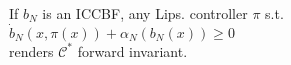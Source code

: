 \documentclass[preview]{standalone}
\begin{document}
\begin{center}
If $b_N$ is an ICCBF, any Lips. controller $\pi$ s.t.\\$\dot b_N(x, \pi(x)) + \alpha_N(b_N(x)) \geq 0$\\renders $\mathcal{C}^*$ forward invariant.
\end{center}
\end{document}
